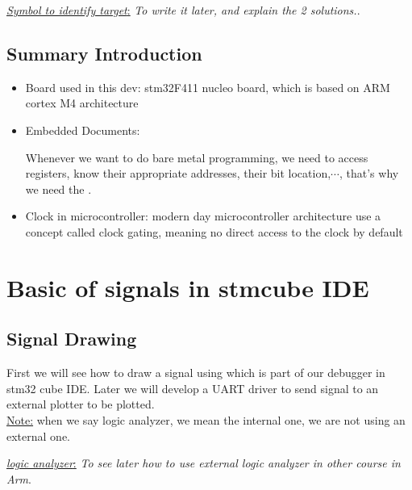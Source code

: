 \documentclass[12pt,a4paper]{book}
\begin{document}
 \underline{ \textit{Symbol to identify target}:} \textit{To write it later, and explain the 2 solutions.}.

\newpage
\section{Summary Introduction}

\begin{itemize}

\item Board used in this dev: stm32F411 nucleo board, which is based on ARM cortex M4 architecture
    
\item Embedded Documents:

Whenever we want to do bare metal programming, we need to access registers, know their appropriate addresses, their bit location,$\cdots$, that's why we need the  .

\item Clock in microcontroller:  modern day microcontroller architecture use a concept called clock gating, meaning no direct access to the clock by default


\end{itemize}



\chapter{Basic of signals in stmcube IDE}

\section{Signal Drawing}

First we will see how to draw a signal using   which is part of our debugger in stm32 cube IDE. Later we will develop a UART driver to send signal to an external plotter to be plotted.\\

\underline{Note:} when we say logic analyzer, we mean the internal one, we are not using an external one.

 \underline{\textit{logic analyzer}:} \textit{To see later how to use external logic analyzer in other course in Arm}.\\
\end{document}
